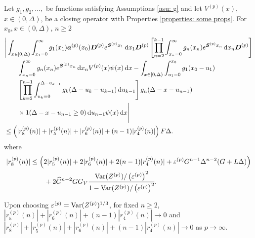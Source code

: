 \begin{cor}\label{cor: fljm7778}
	Let \(g_1,g_2,\dots,\) be functions satisfying Assumptions \ref{asu: g} and let \(V^{(p)}(x)\), \(x\in(0,\Delta)\), be a closing operator with Properties \ref{properties: some props}. For \(x_0,x\in(0,\Delta)\), \(n\geq 2\)
	\begin{align}
		&\Bigg| \int_{x\in[0,\Delta)} \int_{x_1=0}^\infty g_1(x_1) \boldsymbol a^{(p)} (x_0) \boldsymbol D^{(p)} e^{\boldsymbol{S}^{(p)}x_1}\, \mathrm{d} x_1\boldsymbol D^{(p)} 
            	\left[\prod_{n=2}^{k-1}\int_{x_n=0}^\infty g_n(x_n) e^{\boldsymbol{S}^{(p)}x_n} \, \mathrm{d} x_n
		\boldsymbol D^{(p)}\right]\nonumber 
            	\\&\qquad{}\int_{x_n=0}^\infty g_{n}(x_n) e^{\boldsymbol{S}^{(p)}x_n} \, \mathrm{d} x_n V^{(p)}(x) \psi(x)\, \mathrm{d} x - \int_{x\in[0,\Delta)} \int_{u_1=0}^{x_0}g_1(x_0 - u_1)
		\nonumber 
            	\\&\qquad{} \left[\prod_{k=2}^{n-1} \int_{u_k=0}^{\Delta-u_{k-1}} g_k(\Delta-u_k-u_{k-1})\, \mathrm{d} u_{k-1}\right]g_{n}(\Delta - x-u_{n-1}) 
		\\&\qquad{} \times 1(\Delta-x-u_{n-1}\geq0)\, \mathrm{d} u_{n-1}\psi(x)\, \mathrm{d} x \Bigg| \nonumber
		\\&\leq \left(|r_8^{(p)}(n)|+|r_5^{(p)}(n)|+|r_6^{(p)}(n)| + (n-1)|r_4^{(p)}(n)|\right)F\Delta.\label{eqn: KAFnnmna}
	\end{align}
	where 
	\begin{align*}
		|r_8^{(p)}(n)|&\leq  \left( 2|r_5^{(p)}(n)| + 2|r_6^{(p)}(n)| + 2(n-1)|r_4^{(p)}(n)| + \varepsilon^{(p)} G^{n-1}\Delta^{n-2}(G+L\Delta) \right) \\&\qquad{}+ 2\widehat G^{n-2}GG_V\cfrac{\mathrm{Var}(Z^{(p)})/\left(\varepsilon^{(p)}\right)^2}{1-\mathrm{Var}(Z^{(p)})/\left(\varepsilon^{(p)}\right)^2}.
	\end{align*}
\end{cor}
Upon choosing \(\varepsilon^{(p)}=\mathrm{Var}(Z^{(p)})^{1/3}\), for fixed \(n\geq 2\), \( |r_5^{(p)}(n)| + |r_6^{(p)}(n)| + (n-1)|r_4^{(p)}(n)|\to 0\) and \( |r_8^{(p)}|+|r_5^{(p)}(n)| + |r_6^{(p)}(n)| + (n-1)|r_4^{(p)}(n)|\to 0\) as \(p\to \infty\). 

